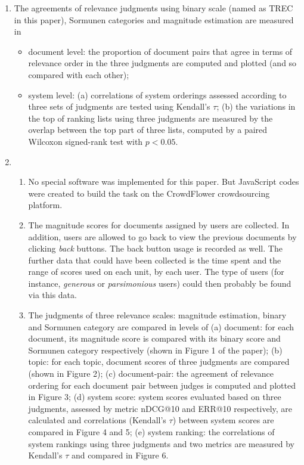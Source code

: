 \documentclass{article}
\begin{document}
\begin{enumerate}
\begin{enumerate}
	\end{enumerate}
\item The agreements of relevance judgments using binary scale (named as TREC in this paper), Sormunen categories and magnitude estimation are measured in
	\begin{itemize}
	\item document level: the proportion of document pairs that agree in terms of relevance order in the three judgments are computed and plotted (and so compared with each other);
	\item system level: (a) correlations of system orderings assessed according to three sets of judgments are tested using Kendall's $\tau$; (b) the variations in the top of ranking lists using three judgments are measured by the overlap between the top part of three lists, computed by a paired Wilcoxon signed-rank test with $p < 0.05$.
	\end{itemize}
\item \begin{enumerate}
	\item No special software was implemented for this paper. But JavaScript codes were created to build the task on the CrowdFlower crowdsourcing platform.
	\item The magnitude scores for documents assigned by users are collected. In addition, users are allowed to go back to view the previous documents by clicking \textit{back} buttons. The back button usage is recorded as well. The further data that could have been collected is the time spent and the range of scores used on each unit, by each user. The type of users (for instance, \textit{generous} or \textit{ parsimonious} users) could then probably be found via this data.
	\item The judgments of three relevance scales: magnitude estimation, binary and Sormunen category are compared in levels of (a) document: for each document, its magnitude score is compared with its binary score and Sormunen category respectively (shown in Figure 1 of the paper); (b) topic: for each topic, document scores of three judgments are compared (shown in Figure 2); (c) document-pair: the agreement of relevance ordering for each document pair between judges is computed and plotted in Figure 3; (d) system score: system scores evaluated based on three judgments, assessed by metric nDCG@10 and ERR@10 respectively, are calculated and correlations (Kendall's $\tau$) between system scores are compared in Figure 4 and 5; (e) system ranking: the correlations of system rankings using three judgments and two metrics are measured by Kendall's $\tau$ and compared in Figure 6. 
	

\end{enumerate}
\end{enumerate}
\end{document}
